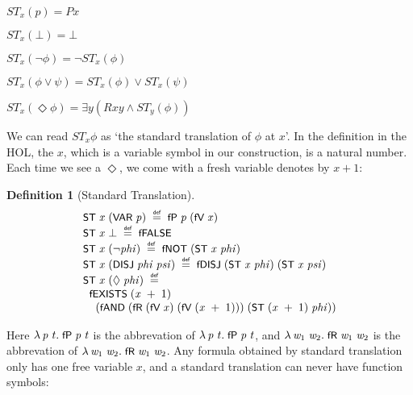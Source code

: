 \documentclass[letterpaper]{article}
\newtheorem{defn}{Definition}
\renewcommand{\HOLConst}[1]{{\textsf{\upshape\small #1}}}
\renewcommand{\HOLinline}[1]{\ensuremath{#1}}
\newenvironment{holmath}{\begin{displaymath}\begin{array}{l}}{\end{array}\end{displaymath}\ignorespacesafterend}
\begin{document}
$ST_x(p)= Px$

$ST_x(\bot)=\bot$

$ST_x(\lnot \phi)=\lnot ST_x(\phi)$

$ST_x(\phi\lor \psi) =ST_x(\phi)\lor ST_x(\psi)$

$ST_x(\Diamond\phi)=\exists y(Rxy\land ST_y(\phi))$



We can read $ST_x \phi$ as `the standard translation of $\phi$ at $x$'. In the definition in the HOL, the $x$, which is a variable symbol in our construction, is a natural number. Each time we see a $\Diamond$, we come with a fresh variable denotes by $x+1$:

\begin{defn}[Standard Translation]
\begin{holmath}
  \HOLConst{ST}\;\HOLFreeVar{x}\;(\HOLConst{VAR}\;\HOLFreeVar{p})\;\HOLSymConst{\HOLTokenDefEquality{}}\;\HOLConst{fP}\;\HOLFreeVar{p}\;(\HOLConst{fV}\;\HOLFreeVar{x})\\
\HOLConst{ST}\;\HOLFreeVar{x}\;\HOLSymConst{\ensuremath{\bot}}\;\HOLSymConst{\HOLTokenDefEquality{}}\;\HOLConst{fFALSE}\\
\HOLConst{ST}\;\HOLFreeVar{x}\;(\HOLSymConst{\HOLTokenNeg{}}\HOLFreeVar{phi})\;\HOLSymConst{\HOLTokenDefEquality{}}\;\HOLConst{fNOT}\;(\HOLConst{ST}\;\HOLFreeVar{x}\;\HOLFreeVar{phi})\\
\HOLConst{ST}\;\HOLFreeVar{x}\;(\HOLConst{DISJ}\;\HOLFreeVar{phi}\;\HOLFreeVar{psi})\;\HOLSymConst{\HOLTokenDefEquality{}}\;\HOLConst{fDISJ}\;(\HOLConst{ST}\;\HOLFreeVar{x}\;\HOLFreeVar{phi})\;(\HOLConst{ST}\;\HOLFreeVar{x}\;\HOLFreeVar{psi})\\
\HOLConst{ST}\;\HOLFreeVar{x}\;(\HOLSymConst{\ensuremath{\Diamond}}\;\HOLFreeVar{phi})\;\HOLSymConst{\HOLTokenDefEquality{}}\\
\;\;\HOLConst{fEXISTS}\;(\HOLFreeVar{x}\;\HOLSymConst{\ensuremath{+}}\;\HOLNumLit{1})\\
\;\;\;\;(\HOLConst{fAND}\;(\HOLConst{fR}\;(\HOLConst{fV}\;\HOLFreeVar{x})\;(\HOLConst{fV}\;(\HOLFreeVar{x}\;\HOLSymConst{\ensuremath{+}}\;\HOLNumLit{1})))\;(\HOLConst{ST}\;(\HOLFreeVar{x}\;\HOLSymConst{\ensuremath{+}}\;\HOLNumLit{1})\;\HOLFreeVar{phi}))
\end{holmath}
\end{defn}
Here \HOLinline{\HOLTokenLambda{}\HOLBoundVar{p}\;\HOLBoundVar{t}.\;\HOLConst{fP}\;\HOLBoundVar{p}\;\HOLBoundVar{t}} is the abbrevation of \HOLinline{\HOLTokenLambda{}\HOLBoundVar{p}\;\HOLBoundVar{t}.\;\HOLConst{fP}\;\HOLBoundVar{p}\;\HOLBoundVar{t}}, and \HOLinline{\HOLTokenLambda{}\HOLBoundVar{w\sb{\mathrm{1}}}\;\HOLBoundVar{w\sb{\mathrm{2}}}.\;\HOLConst{fR}\;\HOLBoundVar{w\sb{\mathrm{1}}}\;\HOLBoundVar{w\sb{\mathrm{2}}}} is the abbrevation of \HOLinline{\HOLTokenLambda{}\HOLBoundVar{w\sb{\mathrm{1}}}\;\HOLBoundVar{w\sb{\mathrm{2}}}.\;\HOLConst{fR}\;\HOLBoundVar{w\sb{\mathrm{1}}}\;\HOLBoundVar{w\sb{\mathrm{2}}}}. Any formula obtained by standard translation only has one free variable $x$, and a standard translation can never have function symbols:
\end{document}
